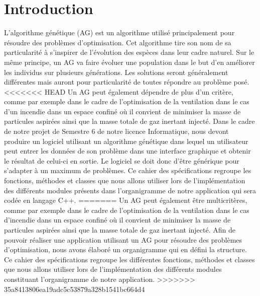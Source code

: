 \documentclass[a4paper,11pt]{article}
\title{\vspace{13em}{\huge Cahier des Spécifications}}
\author{Edouard Fouassier - Maxime Gonthier - Benjamin Guillot\\
		Laureline Martin - Rémi Navarro - Lydia Rodrigez de la Nava
		\vspace{2em}\\
		Algorithme Génétique
		\vspace{2em}}
\begin{document}
	
	\clearpage
	\maketitle\vspace{13em}
\newpage
\tableofcontents
\newpage\clearpage{}
	
	\section{Introduction}
		L’algorithme génétique (AG) est un algorithme utilisé principalement pour résoudre des problèmes d’optimisation. 
		Cet algorithme tire son nom de sa particularité à s’inspirer de l’évolution des espèces dans leur cadre naturel.
		Sur le même principe, un AG va faire évoluer une population dans le but d’en améliorer les individus sur plusieurs générations.
		Les solutions seront généralement différentes mais auront pour particularité de toutes répondre au problème posé.
<<<<<<< HEAD
		Un AG peut également dépendre de plus d'un critère, comme par exemple dans le cadre de l'optimisation de la ventilation dans le cas d’un incendie dans un espace confiné où il convient de minimiser la masse de particules aspirées ainsi que la masse totale de gaz inertant injecté.
		Dans le cadre de notre projet de Semestre 6 de notre licence Informatique, nous devont produire un logiciel utilisant un algorithme génétique dans lequel un utilisateur peut entrer les données de son problème dans une interface graphique et obtenir le résultat de celui-ci en sortie. Le logiciel se doit donc d'être générique pour s'adapter à un maximum de problèmes.
		Ce cahier des spécifications regroupe les fonctions, méthodes et classes que nous allons utiliser lors de l’implémentation des différents modules présents dans l'organigramme de notre application qui sera codée en langage C++.
=======
		Un AG peut également être multicritères, comme par exemple dans le cadre de l'optimisation de la ventilation dans le cas d’incendie dans un espace confiné où il convient de minimiser la masse de particules aspirées ainsi que la masse totale de gaz inertant injecté.
		Afin de pouvoir réaliser une application utilisant un AG pour résoudre des problèmes d’optimisation, nous avons élaboré un organigramme qui en défini la structure. 
		Ce cahier des spécifications regroupe les différentes fonctions, méthodes et classes que nous allons utiliser lors de l’implémentation des différents modules constituant l'organigramme de notre application.
>>>>>>> 35a8413806ea19adc5c53879a328b1541bc664d4
\end{document}
